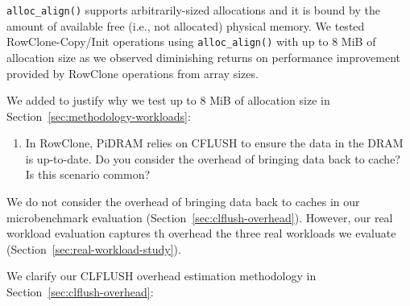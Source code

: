 \texttt{alloc\_align()} supports arbitrarily-sized allocations and it is bound by the amount of available free (i.e., not allocated) physical memory. We tested RowClone-Copy/Init operations using \texttt{alloc\_align()} with up to 8 MiB of allocation size as we observed diminishing returns on performance improvement provided by RowClone operations from  array sizes.

We added  to justify why we test up to 8 MiB of allocation size in Section~\ref{sec:methodology-workloads}:

\vspace{5pt}
\yyboxbegin 
\yyboxend 

\bigbreak
\begin{tcolorbox}
    \begin{enumerate}[label=R1/\arabic*]
        \addtocounter{enumi}{2}
        \item \label{q:r1q3} In RowClone, PiDRAM relies on CFLUSH to ensure the data in the DRAM is up-to-date. Do you consider the overhead of bringing data back to cache? Is this scenario common?
    \end{enumerate}
\end{tcolorbox} 

We do not consider the overhead of bringing data back to caches in our microbenchmark evaluation (Section~\ref{sec:clflush-overhead}).  However, our real workload evaluation captures th overhead  the three real workloads we evaluate (Section~\ref{sec:real-workload-study}).


We clarify our CLFLUSH overhead estimation methodology in Section~\ref{sec:clflush-overhead}:

\vspace{5pt}
\yyboxbegin 
\yyboxend 

\newpage

